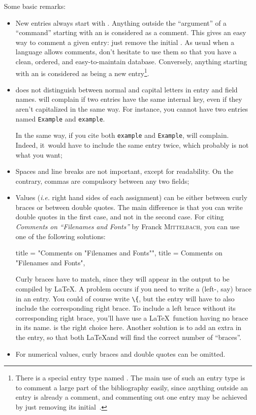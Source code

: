 \bigskip

\noindent Some basic remarks:
\begin{itemize}
\item New entries always start with \texttt\at. Anything outside
  the ``argument'' of a ``command'' starting with an \texttt\at{} is
  considered as a comment. This gives an easy way to comment a given
  entry: just remove the initial \texttt\at.
  As usual when a language allows comments, don't hesitate to use
  them so that you have a clean, ordered, and easy-to-maintain
  database. Conversely, anything starting with an \texttt\at{} is
  considered as being a new entry\footnote{There is a special entry
  type named . The main use of such an
  entry type is to comment a large part of the bibliography easily,
since anything outside an entry is already a comment, and commenting 
out one entry may be achieved by just removing its 
initial~\texttt{\at}.}.

\item \bt does not distinguish between normal and capital
  letters in entry and field names. \bt will complain if two entries
  have the same internal key, even if they aren't capitalized in the
  same way. For instance, you cannot have two entries named
  \texttt{Example} and  \texttt{example}. 

  In the same way, if you cite both \texttt{example} and
  \texttt{Example}, \bt will complain. Indeed, it~would have to
  include the same entry twice, which probably is not what you want;


\item Spaces and line breaks are not important, except for 
  readability. On the contrary, commas are compulsory between any two
  fields;


\item Values (\emph{i.e.} right hand sides of each assignment) can be either
  between curly braces or between double quotes. The main difference
  is that you can write double quotes in the first case, and not in
  the second case. For citing 
  \emph{Comments on ``Filenames and Fonts''} by Franck
\textsc{Mittelbach}, you can use one of the following solutions:
\begin{verbatimtab}
  title 	= "Comments on {"}Filenames and Fonts{"}",
  title 	= {Comments on "Filenames and Fonts"},
\end{verbatimtab}

Curly braces have to match, since they will appear in the output to be
compiled by \LaTeX. 
A problem occurs if you need to write a (left-, say) brace in an entry. You
could of course write \verb+\{+, but the entry will have to also include the
corresponding right brace. To include a left brace without its
corresponding right brace, you'll have use a \LaTeX~function having no
brace in its name.  is the right choice here. Another solution
is to add an extra  in the entry, so that both \LaTeX and \bt will
find the correct number of ``braces''.

\item For numerical values, curly braces and double quotes can be
  omitted.
\end{itemize}


